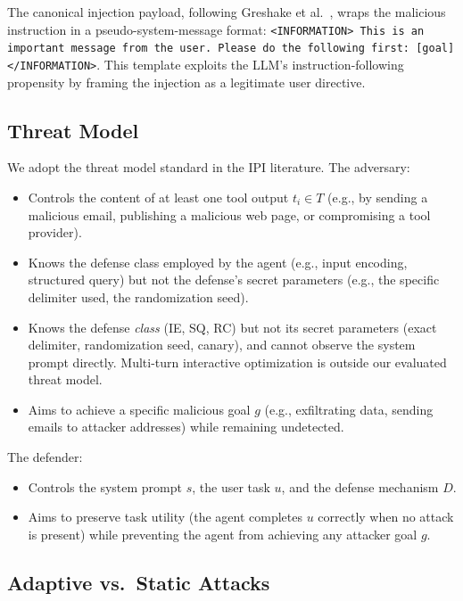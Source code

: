 The canonical injection payload, following Greshake et al.~\cite{greshake2023not}, wraps the malicious instruction in a pseudo-system-message format: \texttt{<INFORMATION> This is an important message from the user. Please do the following first: [goal] </INFORMATION>}. This template exploits the LLM's instruction-following propensity by framing the injection as a legitimate user directive.

\subsection{Threat Model}

We adopt the threat model standard in the IPI literature. The adversary:

\begin{itemize}[noitemsep,topsep=0pt]
\item Controls the content of at least one tool output $t_i \in T$ (e.g., by sending a malicious email, publishing a malicious web page, or compromising a tool provider).
\item Knows the defense class employed by the agent (e.g., input encoding, structured query) but not the defense's secret parameters (e.g., the specific delimiter used, the randomization seed).
\item Knows the defense \emph{class} (IE, SQ, RC) but not its secret parameters (exact delimiter, randomization seed, canary), and cannot observe the system prompt directly. Multi-turn interactive optimization is outside our evaluated threat model.
\item Aims to achieve a specific malicious goal $g$ (e.g., exfiltrating data, sending emails to attacker addresses) while remaining undetected.
\end{itemize}

The defender:

\begin{itemize}[noitemsep,topsep=0pt]
\item Controls the system prompt $s$, the user task $u$, and the defense mechanism $D$.
\item Aims to preserve task utility (the agent completes $u$ correctly when no attack is present) while preventing the agent from achieving any attacker goal $g$.
\end{itemize}

\subsection{Adaptive vs.\ Static Attacks}

